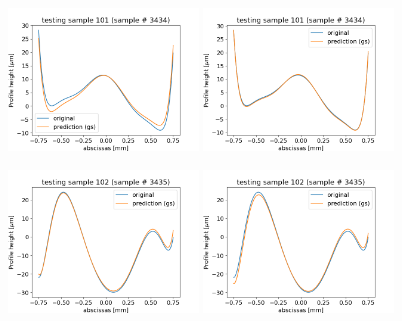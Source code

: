 \documentclass[]{article}
\begin{document}
  

\thispagestyle{empty}


\begin{figure}
\includegraphics[width=0.45\textwidth]{figures/v20p101.png}
\includegraphics[width=0.45\textwidth]{figures/v23p101.png}

\includegraphics[width=0.45\textwidth]{figures/v20p102.png}
\includegraphics[width=0.45\textwidth]{figures/v23p102.png}


\end{figure}
\end{document}
